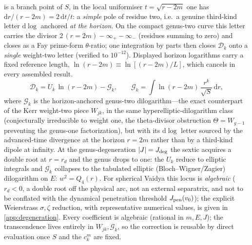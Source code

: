 \documentclass[12pt]{iopart}
\newcommand{\Jpen}{J_{\rm pen}}
\newcommand{\dd}{\mathrm{d}}
\begin{document}
is a branch point of $S$, in the local uniformiser $t=\sqrt{r-2m}$ one has
$\dd r/(r-2m)=2\,\dd t/t$: a \emph{simple} pole of residue two, i.e.\ a genuine
third-kind letter $\dd\log$ anchored \emph{at the horizon}. On the compact
genus-two curve this letter carries the divisor $2\,(r{=}2m)-\infty_+-\infty_-$ (residues
summing to zero) and closes as a Fay prime-form $\theta$-ratio; one integration by parts
then closes $\mathcal{D}_k$ onto a \emph{single} weight-two letter (verified to
$10^{-12}$). Displayed horizon logarithms carry a fixed reference length,
$\ln(r-2m)\equiv\ln[(r-2m)/L]$, which cancels in every assembled result.
\begin{equation}
    \mathcal{D}_k=U_k\,\ln(r-2m)-\mathcal{G}_k,\qquad
    \mathcal{G}_k=\int\ln(r-2m)\,\frac{r^k}{\sqrt S}\,\dd r,
    \label{eq:horizon-dilog}
\end{equation}
where $\mathcal{G}_k$ is the horizon-anchored genus-two dilogarithm---the exact
counterpart of the Kerr weight-two piece $W_{jk}$, in the same
hyperelliptic-dilogarithm class (conjecturally irreducible to weight one, the
theta-divisor obstruction $\Theta=W_{g-1}$ preventing the genus-one factorization),
but with its $\dd\log$ letter sourced by the
advanced-time divergence at the horizon $r=2m$ rather than by a third-kind dipole at
infinity. At the genus-degeneration $|J|=J_{\rm deg}$ the sextic acquires a double root at $r=r_d$
and the genus drops to one: the $U_k$ reduce to elliptic integrals and $\mathcal{G}_k$
collapses to the tabulated elliptic (Bloch--Wigner/Zagier) dilogarithm
\cite{Bloch2000,Zagier1990} on $E:\,w^2=Q_4(r)$. For spherical Vaidya this locus is
\emph{algebraic} ($r_d<0$, a double root off the physical arc, not an external
separatrix, and not to be conflated with the dynamical penetration threshold
$\Jpen(v_0)$); the explicit Weierstrass $\sigma,\zeta$ reduction, with representative
numerical values, is given in \ref{app:degeneration}. Every coefficient is algebraic
(rational in $m,E,J$); the transcendence lives entirely in $W_{jk},\mathcal{G}_k$, so the
correction is reusable by direct evaluation once $S$ and the $c_k^m$ are fixed.
\end{document}
